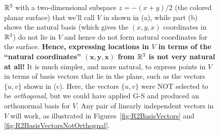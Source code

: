\begin{figure}[h]%
\centering
{}%
\hspace{5pt}%
%
\hspace{5pt}%
    \caption[]{$\mathbb R^3$ with a two-dimensional subspace $z = -(x+y)/2$ (the colored planar surface) that we'll call $V$ in shown in (a), while part (b) shows the natural basis (which gives the $(x, y, x)$ coordinates in $\mathbb R^3$) do not lie in $V$ and hence do not form natural coordinates for the surface. \textbf{Hence, expressing locations in $V$ in terms of the ``natural coordinates'' $\mathbf{(x, y, x)}$ from $\mathbb R^3$ is not very natural at all!} It is much simpler, and more natural, to express points in $V$ in terms of basis vectors that lie in the plane, such as the vectors $\{ u, v\}$ shown in (c). Here, the vectors $\{ u, v\}$ were NOT selected to be \textit{orthogonal}, but we could have applied G-S and produced an orthonormal basis for $V$. Any pair of linearly independent vectors in $V$ will work, as illustrated in Figures~\ref{fig:R2BasisVectors} and \ref{fig:R2BasisVectorsNotOrthognal}.
    }
    \label{fig:Chap10Rn:CoordinatesNew}
\end{figure}


